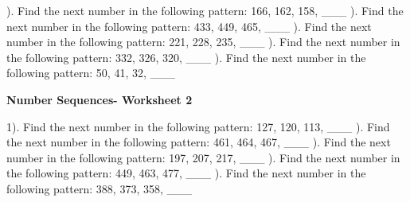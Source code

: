\documentclass{article}%
\begin{document}
\newline%
\newline%
). Find the next number in the following pattern: 166, 162, 158, \_\_\_%
\newline%
\newline%
). Find the next number in the following pattern: 433, 449, 465, \_\_\_%
\newline%
\newline%
). Find the next number in the following pattern: 221, 228, 235, \_\_\_%
\newline%
\newline%
). Find the next number in the following pattern: 332, 326, 320, \_\_\_%
\newline%
\newline%
). Find the next number in the following pattern: 50, 41, 32, \_\_\_%
\newline%
\newline%
\newline%
\pagebreak%
\large%
\begin{center}%
\textbf{Number Sequences- Worksheet 2}%
\newline%
\end{center} \normalsize%
1). Find the next number in the following pattern: 127, 120, 113, \_\_\_%
\newline%
\newline%
). Find the next number in the following pattern: 461, 464, 467, \_\_\_%
\newline%
\newline%
). Find the next number in the following pattern: 197, 207, 217, \_\_\_%
\newline%
\newline%
). Find the next number in the following pattern: 449, 463, 477, \_\_\_%
\newline%
\newline%
). Find the next number in the following pattern: 388, 373, 358, \_\_\_%
\newline%
\newline%
\newline%
\end{document}
